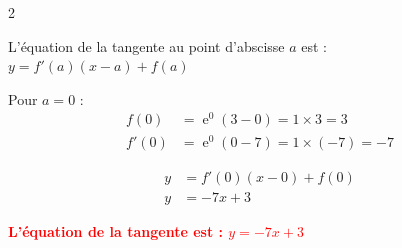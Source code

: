 \documentclass[11pt,a4paper]{article}
\DeclareMathOperator{\e}{e}
\begin{document}
\begin{tcolorbox}[colback=red!5!white,colframe=red!75!black]
\begin{multicols}{2}
    

{
L'équation de la tangente au point d'abscisse $a$ est : $y = f'(a)(x-a) + f(a)$

\vspace{2mm}

Pour $a = 0$ :
\[
\begin{aligned}
f(0) &= \e^{0}(3-0) = 1 \times 3 = 3 \\
f'(0) &= \e^{0}(0-7) = 1 \times (-7) = -7
\end{aligned}
\]

\vspace{2mm}

\[
\begin{aligned}
y &= f'(0)(x-0) + f(0) \\
y &= -7x + 3
\end{aligned}
\]

\vspace{2mm}

\begin{center}
\textbf{\textcolor{red}{L'équation de la tangente est : $y = -7x + 3$}}
\end{center}
}
\end{multicols}
\end{tcolorbox}
\end{document}
